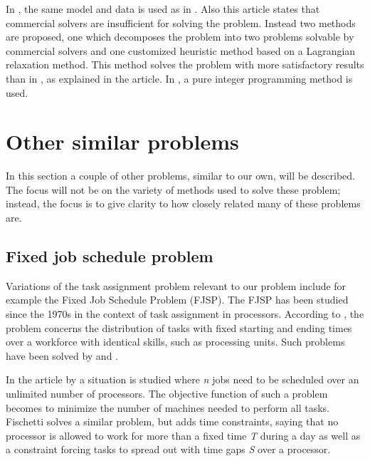 In \citet{hojati_2011}, the same model and data is used as in \citet{loucks_1991}. Also this article states that commercial solvers are insufficient for solving the problem. Instead two methods are proposed, one which decomposes the problem into two problems solvable by commercial solvers and one customized heuristic method based on a Lagrangian relaxation method. This method solves the problem with more satisfactory results than in \citet{loucks_1991}, as explained in the article. In \citet{choi_hwang_park_2009}, a pure integer programming method is used.


\section{Other similar problems}\label{other}
In this section a couple of other problems, similar to our own, will be described. The focus will not be on the variety of methods used to solve these problem; instead, the focus is to give clarity to how closely related many of these problems are.
\subsection{Fixed job schedule problem}
Variations of the task assignment problem relevant to our problem include for example the Fixed Job Schedule Problem (FJSP). The FJSP has been studied since the 1970s in the context of task assignment in processors. According to \citet{krishnamoorthy_2012}, the problem concerns the distribution of tasks with fixed starting and ending times over a workforce with identical skills, such as processing units. Such problems have been solved by \citet{gertsbakh_1977} and \citet{fischetti_1992}.

In the article by \citet{gertsbakh_1977} a situation is studied where \textit{n} jobs need to be scheduled over an unlimited number of processors. The objective function of such a problem becomes to minimize the number of machines needed to perform all tasks. Fischetti solves a similar problem, but adds time constraints, saying that no processor is allowed to work for more than a fixed time \textit{T} during a day as well as a constraint forcing tasks to spread out with time gaps \textit{S} over a processor.

 	
